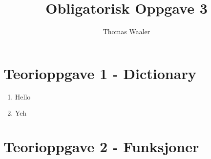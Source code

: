 \documentclass[10pt,a4paper]{article}
\author{Thomas Waaler}
\title{Obligatorisk Oppgave 3}
\begin{document}
\maketitle


\section*{Teorioppgave 1 - Dictionary}
\begin{enumerate}[label=\alph*)]
	\item Hello
	
	\item Yeh
\end{enumerate}

\medskip
\section*{Teorioppgave 2 - Funksjoner}
\end{document}
